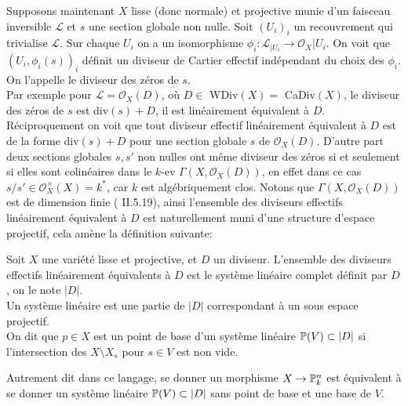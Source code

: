 Supposons maintenant $X$ lisse (donc normale) et projective munie d'un faisceau inversible $\mathcal{L}$ et $s$ une section globale non nulle. Soit $(U_i)_i$ un recouvrement qui trivialise $\mathcal{L}$. Sur chaque $U_i$ on a un isomorphisme $\phi_i:\mathcal{L}_{|U_i}\rightarrow\mathcal{O}_X{|U_i}$. On voit que $(U_i,\phi_i(s))_i$ définit un diviseur de Cartier effectif indépendant du choix des $\phi_i$. On l'appelle le diviseur des zéros de $s$.\\
Par exemple pour $\mathcal{L}=\mathcal{O}_X(D)$, où $D\in $ WDiv$(X)=$ CaDiv$(X)$, le diviseur des zéros de $s$ est div$(s)+D$, il est linéairement équivalent à $D$. Réciproquement on voit que tout diviseur effectif linéairement équivalent à $D$ est de la forme div$(s)+D$ pour une section globale $s$ de $\mathcal{O}_X(D)$. D'autre part deux sections globales $s, s'$ non nulles ont même diviseur des zéros si et seulement si elles sont colinéaires dans le $k$-ev $\Gamma(X, \mathcal{O}_X(D))$, en effet dans ce cas $s/s'\in \mathcal{O}_X^\times(X)=k^*$, car $k$ est algébriquement clos. Notons que $\Gamma(X, \mathcal{O}_X(D))$ est de dimension finie (\cite{Hartshorne} II.5.19), ainsi l'ensemble des diviseurs effectifs linéairement équivalent à $D$ est naturellement muni d'une structure d'espace projectif, cela amène la définition suivante:
\begin{defn}
Soit $X$ une variété lisse et projective, et $D$ un diviseur. L'ensemble des diviseurs effectifs linéairement équivalents à $D$ est le système linéaire complet définit par $D$, on le note $|D|$.\\ Un système linéaire est une partie de $|D|$ correspondant à un sous espace projectif.\\
On dit que $p\in X$ est un point de base d'un système linéaire $\mathbb{P}(V)\subset |D|$ si l'intersection des $X\setminus X_s$ pour $s\in V$ est non vide. 
\end{defn}

Autrement dit dans ce langage, se donner un morphisme $X\rightarrow \mathbb{P}^n_k$ est équivalent à se donner un système linéaire $\mathbb{P}(V)\subset |D|$ sans point de base et une base de $V$.
